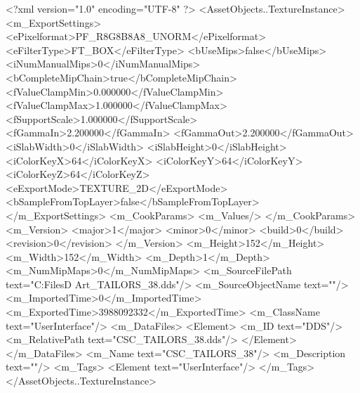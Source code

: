 <?xml version="1.0" encoding="UTF-8" ?>
<AssetObjects..TextureInstance>
	<m_ExportSettings>
		<ePixelformat>PF_R8G8B8A8_UNORM</ePixelformat>
		<eFilterType>FT_BOX</eFilterType>
		<bUseMips>false</bUseMips>
		<iNumManualMips>0</iNumManualMips>
		<bCompleteMipChain>true</bCompleteMipChain>
		<fValueClampMin>0.000000</fValueClampMin>
		<fValueClampMax>1.000000</fValueClampMax>
		<fSupportScale>1.000000</fSupportScale>
		<fGammaIn>2.200000</fGammaIn>
		<fGammaOut>2.200000</fGammaOut>
		<iSlabWidth>0</iSlabWidth>
		<iSlabHeight>0</iSlabHeight>
		<iColorKeyX>64</iColorKeyX>
		<iColorKeyY>64</iColorKeyY>
		<iColorKeyZ>64</iColorKeyZ>
		<eExportMode>TEXTURE_2D</eExportMode>
		<bSampleFromTopLayer>false</bSampleFromTopLayer>
	</m_ExportSettings>
	<m_CookParams>
		<m_Values/>
	</m_CookParams>
	<m_Version>
		<major>1</major>
		<minor>0</minor>
		<build>0</build>
		<revision>0</revision>
	</m_Version>
	<m_Height>152</m_Height>
	<m_Width>152</m_Width>
	<m_Depth>1</m_Depth>
	<m_NumMipMaps>0</m_NumMipMaps>
	<m_SourceFilePath text="C:\Users\Shadow\Desktop\Working Files\2D Art\Quarters\Tailors\CSC_TAILORS_38.dds"/>
	<m_SourceObjectName text=""/>
	<m_ImportedTime>0</m_ImportedTime>
	<m_ExportedTime>3988092332</m_ExportedTime>
	<m_ClassName text="UserInterface"/>
	<m_DataFiles>
		<Element>
			<m_ID text="DDS"/>
			<m_RelativePath text="CSC_TAILORS_38.dds"/>
		</Element>
	</m_DataFiles>
	<m_Name text="CSC_TAILORS_38"/>
	<m_Description text=""/>
	<m_Tags>
		<Element text="UserInterface"/>
	</m_Tags>
</AssetObjects..TextureInstance>

